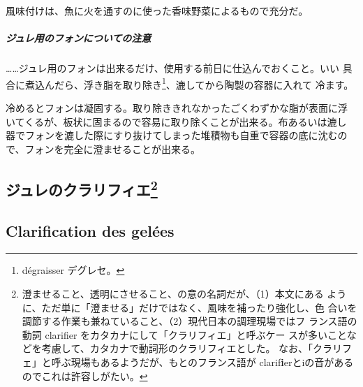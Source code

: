 \begin{recette}
風味付けは、魚に火を通すのに使った香味野菜によるもので充分だ。

\hypertarget{observation-sur-l-emplois-des-fonds-destines-aux-gelees}{%
\subparagraph{ジュレ用のフォンについての注意}\label{observation-sur-l-emplois-des-fonds-destines-aux-gelees}}

\ldots{}\ldots{}ジュレ用のフォンは出来るだけ、使用する前日に仕込んでおくこと。いい
具合に煮込んだら、浮き脂を取り除き\footnote{dégraisser デグレセ。}、漉してから陶製の容器に入れて
冷ます。

冷めるとフォンは凝固する。取り除ききれなかったごくわずかな脂が表面に浮
いてくるが、板状に固まるので容易に取り除くことが出来る。布あるいは漉し
器でフォンを漉した際にすり抜けてしまった堆積物も自重で容器の底に沈むの
で、フォンを完全に澄ませることが出来る。
\end{recette}
\newpage

\hypertarget{ux30b8ux30e5ux30ecux306eux30afux30e9ux30eaux30d5ux30a3ux30a816}{%
\subsection[ジュレのクラリフィエ]{\texorpdfstring{ジュレのクラリフィエ\footnote{澄ませること、透明にさせること、の意の名詞だが、（1）本文にある
  ように、ただ単に「澄ませる」だけではなく、風味を補ったり強化し、色
  合いを調節する作業も兼ねていること、（2）現代日本の調理現場ではフ
  ランス語の動詞 clarifier をカタカナにして「クラリフィエ」と呼ぶケー
  スが多いことなどを考慮して、カタカナで動詞形のクラリフィエとした。
  なお、「クラリフェ」と呼ぶ現場もあるようだが、もとのフランス語が
  clarif\textbf{i}erとiの音があるのでこれは許容しがたい。}}{ジュレのクラリフィエ}}\label{ux30b8ux30e5ux30ecux306eux30afux30e9ux30eaux30d5ux30a3ux30a816}}

\vspace*{-2\zw}

\hypertarget{clariication-des-gelees}{%
\subsection{Clarification des gelées}\label{clariication-des-gelees}}

